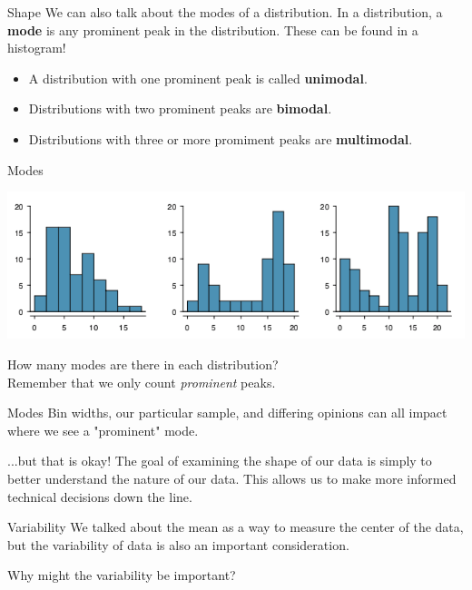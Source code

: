 \begin{frame}{Shape}
    We can also talk about the modes of a distribution. In a distribution, a \textbf{mode} is any prominent peak in the distribution. These can be found in a histogram! 
    \begin{itemize}
        \item A distribution with one prominent peak is called \textbf{unimodal}.
        \item Distributions with two prominent peaks are \textbf{bimodal}.
        \item Distributions with three or more promiment peaks are \textbf{multimodal}. 
    \end{itemize}
\end{frame}

\begin{frame}{Modes}
    \begin{center}
        \includegraphics[scale=0.5]{images/modes.png}
    \end{center}
    
    How many modes are there in each distribution? \\ Remember that we only count \textit{prominent} peaks.
\end{frame}

\begin{frame}{Modes}
    Bin widths, our particular sample, and differing opinions can all impact where we see a "prominent" mode.
    
    \vspace{12pt} ...but that is okay! The goal of examining the shape of our data is simply to better understand the nature of our data. This allows us to make more informed technical decisions down the line. 
\end{frame}

\begin{frame}{Variability}
    We talked about the mean as a way to measure the center of the data, but the variability of data is also an important consideration. 
    
    \vspace{12pt}
    Why might the variability be important?
\end{frame}

